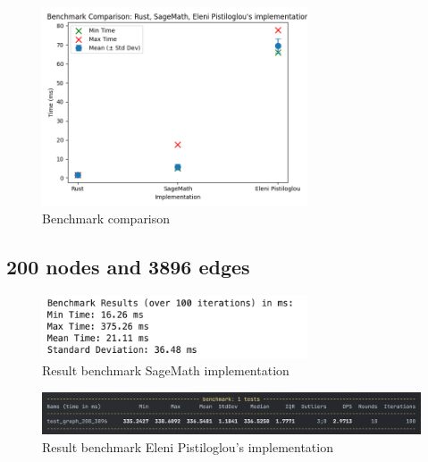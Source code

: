 \begin{figure}[!h]
    \centering
    \includegraphics[width=0.70\textwidth]{images/benchmark/graph_100_970/benchmark_comparison_graph_100_970}
    \caption{Benchmark comparison}
    \label{fig:benchmark-comparison-graph-100-970}
\end{figure}


\newpage


\subsection{200 nodes and 3896 edges}\label{subsec:result-for-graphs-200-3896}

\begin{figure}[!h]
    \centering
    \includegraphics[width=0.70\textwidth]{images/benchmark/graph_200_3896/benchmark_graph_200_3896_sagemath}
    \caption{Result benchmark SageMath implementation}
    \label{fig:benchmark-graph-200-3896-sagemath}
\end{figure}

\begin{figure}[!h]
    \centering
    \includegraphics[width=1\textwidth]{images/benchmark/graph_200_3896/benchmark_graph_200_3996_python}
    \caption{Result benchmark Eleni Pistiloglou's implementation}
    \label{fig:benchmark-graph-200-3896-python}
\end{figure}

